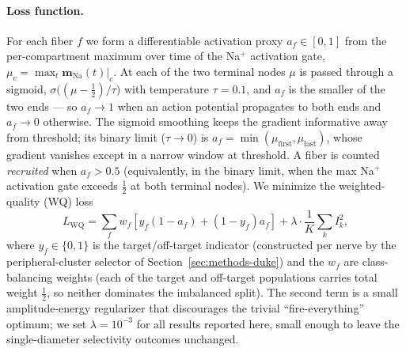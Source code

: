 \paragraph{Loss function.}
For each fiber $f$ we form a differentiable activation proxy
$a_f \in [0,1]$ from the per-compartment maximum over time of the
Na$^+$ activation gate, $\mu_c = \max_t \mathbf{m}_{\mathrm{Na}}(t)|_c$.
At each of the two terminal nodes $\mu$ is passed through a sigmoid,
$\sigma\!\bigl((\mu - \tfrac12)/\tau\bigr)$ with temperature
$\tau = 0.1$, and $a_f$ is the smaller of the two ends --- so
$a_f \to 1$ when an action potential propagates to both ends and
$a_f \to 0$ otherwise.  The sigmoid smoothing keeps the gradient
informative away from threshold; its binary limit
($\tau\!\to\!0$) is $a_f = \min(\mu_{\mathrm{first}},
\mu_{\mathrm{last}})$, whose gradient vanishes except in a narrow
window at threshold.  A fiber is counted \emph{recruited} when
$a_f > 0.5$ (equivalently, in the binary limit, when the max Na$^+$
activation gate exceeds $\tfrac12$ at both terminal nodes).  We
minimize the weighted-quality (WQ) loss
\begin{equation}
  L_{\mathrm{WQ}} = \sum_f w_f \left[ y_f (1 - a_f) + (1 - y_f) a_f \right]
                 + \lambda \cdot \frac{1}{K} \sum_k I_k^2,
  \label{eq:wq-loss}
\end{equation}
where $y_f \in \{0,1\}$ is the target/off-target indicator
(constructed per nerve by the peripheral-cluster selector of
Section~\ref{sec:methods-duke}) and the $w_f$ are class-balancing
weights (each of the target and off-target populations carries total
weight $\tfrac12$, so neither dominates the imbalanced split).  The
second term is a small amplitude-energy regularizer that discourages
the trivial ``fire-everything'' optimum; we set $\lambda = 10^{-3}$ for
all results reported here, small enough to leave the single-diameter
selectivity outcomes unchanged.

